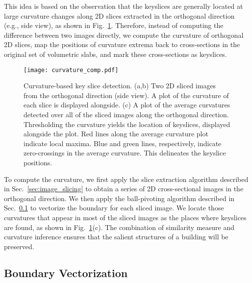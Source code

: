 \documentclass[10pt, conference, compsocconf]{IEEEtran}
\newcommand{\Fig}[1]{Fig.~\ref{fig:#1}}
\newcommand{\Sec}[1]{Sec.~\ref{sec:#1}}
\newcommand{\Figc}[1]{Fig.~\ref{fig:#1}(c)}
\begin{document}
This idea is based on the observation that the keyslices are generally
located at large curvature changes along 2D slices extracted in the orthogonal
direction (e.g., side view), as shown in \Fig{HT_BPA_Curvature}.
Therefore, instead of computing the difference between two images directly,
we compute the curvature of orthogonal 2D slices, map the positions of
curvature extrema back to cross-sections in the original set of volumetric
slabs, and mark these cross-sections as keyslices.

\begin{figure}[htbp]
\centerline{\texttt{[image: curvature\_comp.pdf]}}
\caption{Curvature-based key slice detection.
(a,b) Two 2D sliced images from the orthogonal direction (side view).
A plot of the curvature of each slice is displayed alongside.
(c) A plot of the average curvatures detected over all of the sliced
images along the orthogonal direction.
Thresholding the curvature yields the location of keyslices, displayed
alongside the plot.
Red lines along the average curvature plot indicate local maxima.
Blue and green lines, respectively, indicate zero-crossings in the
average curvature.
This delineates the keyslice positions.
}
\label{fig:HT_BPA_Curvature}
\end{figure}

To compute the curvature, we first apply the slice extraction algorithm
described in \Sec{image_slicing} to obtain a series of 2D cross-sectional
images in the orthogonal direction.
We then apply the ball-pivoting algorithm described in \Sec{BPA} to
vectorize the boundary for each sliced image.
We locate those curvatures that appear in most of the sliced images as the
places where keyslices are found, as shown in \Figc{HT_BPA_Curvature}.
The combination of similarity measure and curvature inference
ensures that the salient structures of a building will be preserved.

\subsection{Boundary Vectorization}
\label{sec:BPA}
\end{document}
